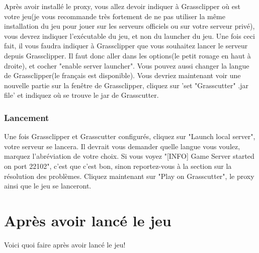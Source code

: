 \documentclass{article}
\begin{document}
Après avoir installé le proxy, vous allez devoir indiquer à Grassclipper où est votre jeu(je vous recommande très fortement de ne pas utiliser la même installation du jeu pour jouer sur les serveurs officiels ou sur votre serveur privé), vous devrez indiquer l'exécutable du jeu, et non du launcher du jeu.\newline
Une fois ceci fait, il vous faudra indiquer à Grassclipper que vous souhaitez lancer le serveur depuis Grassclipper. Il faut donc aller dans les options(le petit rouage en haut à droite), et cocher "enable server launcher". Vous pouvez aussi changer la langue de Grassclipper(le français est disponible).\newline
Vous devriez maintenant voir une nouvelle partie sur la fenêtre de Grassclipper, cliquez sur 'set "Grasscutter" .jar file' et indiquez où se trouve le jar de Grasscutter. 

\subsubsection{Lancement}
Une fois Grassclipper et Grasscutter configurés, cliquez sur "Launch local server", votre serveur se lancera. Il devrait vous demander quelle langue vous voulez, marquez l'abréviation de votre choix. Si vous voyez "[INFO] Game Server started on port 22102", c'est que c'est bon, sinon reportez-vous à la section sur la résolution des problèmes.\newline
Cliquez maintenant sur "Play on Grasscutter", le proxy ainsi que le jeu se lanceront.

\hrulefill

\section{Après avoir lancé le jeu}
Voici quoi faire après avoir lancé le jeu!
\end{document}
